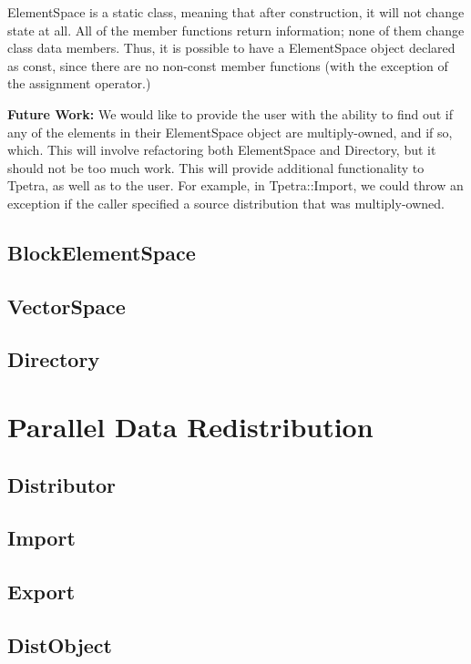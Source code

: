 \documentclass[10pt,relax]{TpetraDesign}
\begin{document}
ElementSpace is a static class, meaning that after construction, it will not change state at all. All of the member functions return information; none of them change class data members. Thus, it is possible to have a ElementSpace object declared as const, since there are no non-const member functions (with the exception of the assignment operator.)

\textbf{Future Work:} We would like to provide the user with the ability to find out if any of the elements in their ElementSpace object are multiply-owned, and if so, which. This will involve refactoring both ElementSpace and Directory, but it should not be too much work. This will provide additional functionality to Tpetra, as well as to the user. For example, in Tpetra::Import, we could throw an exception if the caller specified a source distribution that was multiply-owned.

\subsection{BlockElementSpace}

\subsection{VectorSpace}

\subsection{Directory}

\section{Parallel Data Redistribution}

\subsection{Distributor}

\subsection{Import}

\subsection{Export}

\subsection{DistObject}
\end{document}
